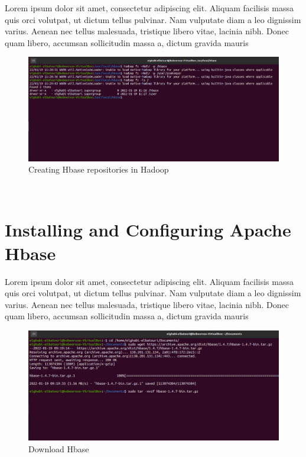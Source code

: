 \begin{spacing}{1.2}
\par Lorem ipsum dolor sit amet, consectetur adipiscing elit. Aliquam facilisis massa quis orci volutpat, ut dictum tellus pulvinar. Nam vulputate diam a leo dignissim varius. Aenean nec tellus malesuada, tristique libero vitae, lacinia nibh. Donec quam libero, accumsan sollicitudin massa a, dictum gravida mauris
\\
\begin{figure}[!htb] 
\begin{center} 
\includegraphics[width=1\linewidth]{Pictures/HBase/Configuring Hbase in Standalone & Pseudo-distributed mode/Configuring Hbase in Standalone mode/Creating Hbase repositories in Hadoop} 
\end{center} 
\caption{Creating Hbase repositories in Hadoop} 
\end{figure}  \FloatBarrier
\\
\section{Installing and Configuring Apache Hbase }
\par Lorem ipsum dolor sit amet, consectetur adipiscing elit. Aliquam facilisis massa quis orci volutpat, ut dictum tellus pulvinar. Nam vulputate diam a leo dignissim varius. Aenean nec tellus malesuada, tristique libero vitae, lacinia nibh. Donec quam libero, accumsan sollicitudin massa a, dictum gravida mauris
\\
\begin{figure}[!htb] 
\begin{center} 
\includegraphics[width=1\linewidth]{Pictures/HBase/Configuring Hbase in Standalone & Pseudo-distributed mode/Installing and Configuring Apache Hbase/Download Hbase} 
\end{center} 
\caption{Download Hbase} 
\end{figure}  \FloatBarrier
\\


\end{spacing}
